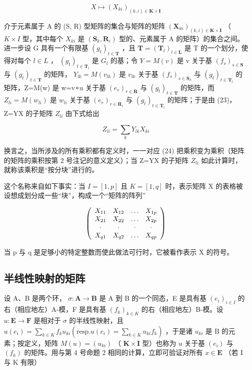 \[
X \mapsto (X _ {k i}) _ {(k, i) \in \mathbf {K} \times \mathbf {I}}\tag{24}
\]

介于元素属于 A 的 (S, R) 型矩阵的集合与矩阵的矩阵 \((\mathbf{X}_{ki})_{(k,i)\in\mathbf{K}\times\mathbf{I}}\) （ \(K\times I\) 型，其中每个 \(X_{ki}\) 是 \((\mathbf{S}_{k},\mathbf{R}_{i})\) 型的、元素属于 A 的矩阵）的集合之间。进一步设 G 具有一个有限基 \((g_{t})_{t\in\mathbf{T}}\) ，且 \(\mathbf{T}=(\mathbf{T}_{l})_{l\in\mathbf{L}}\) 是 T 的一个划分，使得对每个 \(l\in L\) ， \((g_{t})_{t\in\mathbf{T}_{l}}\) 是 \(G_{l}\) 的基；令 \(Y=M(v)\) 是 v 关于基 \((f_{s})_{s\in\mathbf{S}}\) 与 \((g_{t})_{t\in\mathbf{T}}\) 的矩阵， \(Y_{lk}=M(v_{lk})\) 是 \(v_{lk}\) 关于基 \((f_{s})_{s\in\mathbf{S}_{k}}\) 与 \((g_{t})_{t\in\mathbf{T}_{l}}\) 的矩阵，Z=M(w) 是 w=v∘u 关于基 \((e_{r})_{r\in\mathbf{R}}\) 与 \((g_{t})_{t\in\mathbf{T}}\) 的矩阵，而 \(Z_{li}=M(w_{li})\) 是 \(w_{li}\) 关于基 \((e_{r})_{r\in\mathbf{R}_{i}}\) 与 \((g_{t})_{t\in\mathbf{T}_{l}}\) 的矩阵；于是由 (23)，Z=YX 的子矩阵 \(Z_{li}\) 由下式给出

\[
Z _ {l i} = \sum_ {k} Y _ {l k} X _ {k i}\tag{25}
\]

换言之，当所涉及的所有乘积都有定义时，一一对应 (24) 把乘积变为乘积（矩阵的矩阵的乘积按第 2 号注记的意义定义）；当 Z=YX 的子矩阵 \(Z_{li}\) 如此计算时，就称该乘积是“按分块”进行的。

这个名称来自如下事实：当 \(I = [1, p]\) 且 \(K = [1, q]\) 时，表示矩阵 X 的表格被设想成划分成一些“块”，构成一个“矩阵的阵列”

\[
\left( \begin{array}{c c c c} X _ {1 1} & X _ {1 2} & \ldots & X _ {1 p} \\ X _ {2 1} & X _ {2 2} & \ldots & X _ {2 p} \\ \cdot & \cdot & \cdot & \cdot \\ X _ {q 1} & X _ {q 2} & \ldots & X _ {q p} \end{array} \right)
\]

当 p 与 q 是足够小的特定整数而使此做法可行时，它被看作表示 X 的符号。

\subsection{半线性映射的矩阵}

设 A、B 是两个环， \(\sigma: \mathbf{A} \to \mathbf{B}\) 是 A 到 B 的一个同态，E 是具有基 \((e_i)_{i \in I}\) 的右（相应地左）A-模，F 是具有基 \((f_k)_{k\in K}\) 的右（相应地左）B-模。设 \(u:\mathbf{E}\to \mathbf{F}\) 是相对于 \(\sigma\) 的半线性映射，且 \(u(e_i) = \sum_{k\in K}f_ku_{ki}\left(\text{resp.} u(e_i) = \sum_{k\in K}u_{ki}f_k\right)\) ，于是诸 \(u_{ki}\) 是 B 的元素；按定义，矩阵 \(M(u) = (u_{ki})\) （ \(\mathbf{K}\times \mathbf{I}\) 型）也称为 \(u\) 关于基 \((e_i)\) 与 \((f_k)\) 的矩阵。用与第 4 号命题 2 相同的计算，立即可验证对所有 \(x\in \mathbf{E}\) （若 I 与 K 有限）

